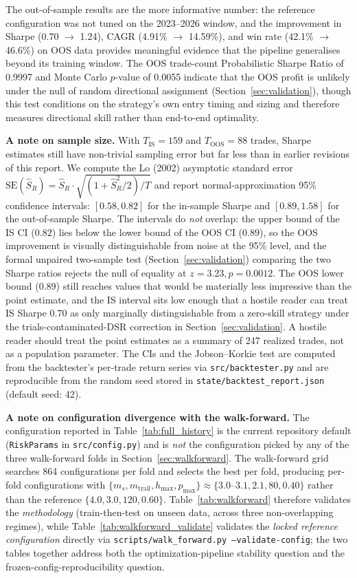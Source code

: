 \documentclass{article}
\begin{document}
The out-of-sample results are the more informative number: the reference configuration was not tuned on the 2023--2026 window, and the improvement in Sharpe (0.70 $\to$ 1.24), CAGR (4.91\% $\to$ 14.59\%), and win rate (42.1\% $\to$ 46.6\%) on OOS data provides meaningful evidence that the pipeline generalises beyond its training window.
The OOS trade-count Probabilistic Sharpe Ratio of 0.9997 and Monte Carlo $p$-value of 0.0055 indicate that the OOS profit is unlikely under the null of random directional assignment (Section~\ref{sec:validation}), though this test conditions on the strategy's own entry timing and sizing and therefore measures directional skill rather than end-to-end optimality.

\textbf{A note on sample size.}
With $T_{\text{IS}} = 159$ and $T_{\text{OOS}} = 88$ trades, Sharpe estimates still have non-trivial sampling error but far less than in earlier revisions of this report.
We compute the Lo (2002) asymptotic standard error $\text{SE}(\hat{S}_R) = \hat{S}_R \cdot \sqrt{(1 + \hat{S}_R^2 / 2) / T}$ and report normal-approximation 95\% confidence intervals: $[0.58, 0.82]$ for the in-sample Sharpe and $[0.89, 1.58]$ for the out-of-sample Sharpe.
The intervals do \emph{not} overlap: the upper bound of the IS CI ($0.82$) lies below the lower bound of the OOS CI ($0.89$), so the OOS improvement is visually distinguishable from noise at the 95\% level, and the formal unpaired two-sample test (Section~\ref{sec:validation}) comparing the two Sharpe ratios rejects the null of equality at $z = 3.23, p = 0.0012$.
The OOS lower bound ($0.89$) still reaches values that would be materially less impressive than the point estimate, and the IS interval sits low enough that a hostile reader can treat IS Sharpe 0.70 as only marginally distinguishable from a zero-skill strategy under the trials-contaminated-$\text{DSR}$ correction in Section~\ref{sec:validation}.
A hostile reader should treat the point estimates as a summary of 247 realized trades, not as a population parameter.
The CIs and the Jobson--Korkie test are computed from the backtester's per-trade return series via \texttt{src/backtester.py} and are reproducible from the random seed stored in \texttt{state/backtest\_report.json} (default seed: 42).

\textbf{A note on configuration divergence with the walk-forward.}
The configuration reported in Table~\ref{tab:full_history} is the current repository default (\texttt{RiskParams} in \texttt{src/config.py}) and is \emph{not} the configuration picked by any of the three walk-forward folds in Section~\ref{sec:walkforward}.
The walk-forward grid searches 864 configurations per fold and selects the best per fold, producing per-fold configurations with $\{m_s, m_{\text{trail}}, h_{\max}, p_{\max}\} \approx \{3.0\text{--}3.1, 2.1, 80, 0.40\}$ rather than the reference $\{4.0, 3.0, 120, 0.60\}$.
Table~\ref{tab:walkforward} therefore validates the \emph{methodology} (train-then-test on unseen data, across three non-overlapping regimes), while Table~\ref{tab:walkforward_validate} validates the \emph{locked reference configuration} directly via \texttt{scripts/walk\_forward.py --validate-config}; the two tables together address both the optimization-pipeline stability question and the frozen-config-reproducibility question.
\end{document}

